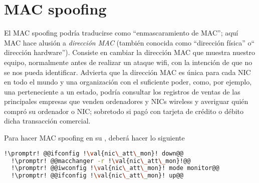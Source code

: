\section{MAC spoofing}\label{sec:mac-spoofing}
El MAC spoofing podría traducirse como ``enmascaramiento de MAC''; aquí MAC hace alusión a \emph{dirección MAC}
(también conocida como ``dirección física'' o`` dirección hardware''). Consiste en cambiar la dirección MAC que
muestra nuestro equipo, normalmente antes de realizar un ataque wifi, con la intención de que no se nos pueda
identificar. Advierta que la dirección MAC es única para cada NIC en todo el mundo y una organización con el
suficiente poder, como, por ejemplo, una perteneciente a un estado, podría consultar los registros de ventas de
las principales empresas que venden ordenadores y NICs wireless y averiguar quién compró su ordenador o NIC;
sobretodo si pagó con tarjeta de crédito o débito dicha transacción comercial.

Para hacer MAC spoofing en su , deberá hacer lo siguiente

\begin{lstlisting}[gobble=2,language=bash,style=bashinteract,escapechar=!]
  !\promptr! @@ifconfig !\val{nic\_att\_mon}! down@@
  !\promptr! @@macchanger -r !\val{nic\_att\_mon}!@@
  !\promptr! @@iwconfig !\val{nic\_att\_mon}! mode monitor@@
  !\promptr! @@ifconfig !\val{nic\_att\_mon}! up@@
\end{lstlisting}
